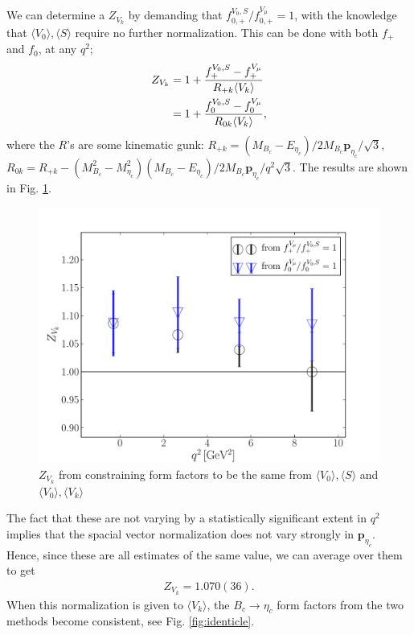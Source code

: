 We can determine a $Z_{V_k}$ by demanding that $f_{0,+}^{V_0,S}/f_{0,+}^{V_{\mu}}=1$, with the knowledge that $\langle V_0 \rangle, \langle S \rangle$ require no further normalization. This can be done with both $f_+$ and $f_0$, at any $q^2$;
\begin{align}
	Z_{V_k} &= 1 + {f_+^{V_0,S} - f_+^{V_{\mu}} \over R_{+k} \langle V_k \rangle }  \\
	&= 1 + {f_0^{V_0,S} - f_0^{V_{\mu}} \over R_{0k} \langle V_k \rangle },
\end{align}
where the $R$'s are some kinematic gunk: $R_{+k} = ( M_{B_c} - E_{\eta_c} )/2M_{B_c}{\textbf{p}}_{\eta_c}/\sqrt{3}$, \\ $R_{0k} = R_{+k} - {( M_{B_c}^2-M_{\eta_c}^2 )(M_{B_c}-E_{\eta_c})/2M_{B_c} {\textbf{p}}_{\eta_c}/q^2\sqrt{3}}$. The results are shown in Fig. \ref{fig:ZVk}.
\begin{figure}[htb!]
\centering
\includegraphics[scale=0.5]{images/nrqcd/ZVk.pdf}
\caption{$Z_{V_k}$ from constraining form factors to be the same from $\langle V_0 \rangle,\langle S \rangle$ and $\langle V_0 \rangle,\langle V_k \rangle$}
\label{fig:ZVk}
\end{figure}
The fact that these are not varying by a statistically significant extent in $q^2$ implies that the spacial vector normalization does not vary strongly in ${\textbf{p}}_{\eta_c}$. Hence, since these are all estimates of the same value, we can average over them to get
\begin{align}
	Z_{V_k} = 1.070(36).
\end{align}
When this normalization is given to $\langle V_k \rangle$, the $B_c\to\eta_c$ form factors from the two methods become consistent, see Fig. \ref{fig:identicle}.


